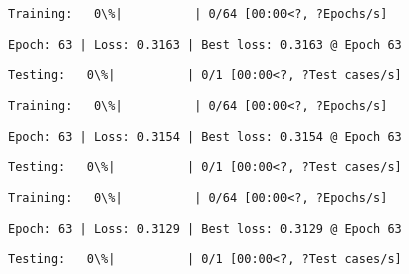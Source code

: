 \documentclass[11pt]{article}
\begin{document}
    
    
    \begin{Verbatim}[commandchars=\\\{\}]
Training:   0\%|          | 0/64 [00:00<?, ?Epochs/s]
    \end{Verbatim}

    
    \begin{Verbatim}[commandchars=\\\{\}]
Epoch: 63 | Loss: 0.3163 | Best loss: 0.3163 @ Epoch 63
    \end{Verbatim}

    
    \begin{Verbatim}[commandchars=\\\{\}]
Testing:   0\%|          | 0/1 [00:00<?, ?Test cases/s]
    \end{Verbatim}

    
    
    \begin{Verbatim}[commandchars=\\\{\}]
Training:   0\%|          | 0/64 [00:00<?, ?Epochs/s]
    \end{Verbatim}

    
    \begin{Verbatim}[commandchars=\\\{\}]
Epoch: 63 | Loss: 0.3154 | Best loss: 0.3154 @ Epoch 63
    \end{Verbatim}

    
    \begin{Verbatim}[commandchars=\\\{\}]
Testing:   0\%|          | 0/1 [00:00<?, ?Test cases/s]
    \end{Verbatim}

    
    
    \begin{Verbatim}[commandchars=\\\{\}]
Training:   0\%|          | 0/64 [00:00<?, ?Epochs/s]
    \end{Verbatim}

    
    \begin{Verbatim}[commandchars=\\\{\}]
Epoch: 63 | Loss: 0.3129 | Best loss: 0.3129 @ Epoch 63
    \end{Verbatim}

    
    \begin{Verbatim}[commandchars=\\\{\}]
Testing:   0\%|          | 0/1 [00:00<?, ?Test cases/s]
    \end{Verbatim}
\end{document}

